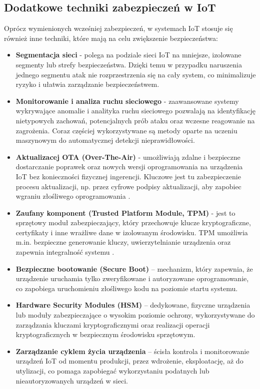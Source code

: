 \subsection{Dodatkowe techniki zabezpieczeń w IoT}
Oprócz wymienionych wcześniej zabezpieczeń, w systemach IoT stosuje się również inne techniki, które mają na celu zwiększenie bezpieczeństwa:
\begin{itemize}
    \item \textbf{Segmentacja sieci} - polega na podziale sieci IoT na mniejsze, izolowane segmenty lub strefy bezpieczeństwa. Dzięki temu w przypadku naruszenia jednego segmentu atak nie rozprzestrzenia się na cały system, co minimalizuje ryzyko i ułatwia zarządzanie bezpieczeństwem.
    
    \item \textbf{Monitorowanie i analiza ruchu sieciowego} - zaawansowane systemy wykrywające anomalie i analityka ruchu sieciowego pozwalają na identyfikację nietypowych zachowań, potencjalnych prób ataku oraz wczesne reagowanie na zagrożenia. Coraz częściej wykorzystywane są metody oparte na uczeniu maszynowym do automatycznej detekcji nieprawidłowości.
    
    \item \textbf{Aktualizacej OTA (Over-The-Air)} - umożliwiają zdalne i bezpieczne dostarczanie poprawek oraz nowych wersji oprogramowania na urządzenia IoT bez konieczności fizycznej ingerencji. Kluczowe jest tu zabezpieczenie procesu aktualizacji, np. przez cyfrowe podpisy aktualizacji, aby zapobiec wgraniu złośliwego oprogramowania \cite{android_ota}.
    
    \item \textbf{Zaufany komponent (Trusted Platform Module, TPM)} - jest to sprzętowy moduł zabezpieczający, który przechowuje klucze kryptograficzne, certyfikaty i inne wrażliwe dane w izolowanym środowisku. TPM umożliwia m.in. bezpieczne generowanie kluczy, uwierzytelnianie urządzenia oraz zapewnia integralność systemu \cite{tpm}.
    
    \item \textbf{Bezpieczne bootowanie (Secure Boot)} – mechanizm, który zapewnia, że urządzenie uruchamia tylko zweryfikowane i autoryzowane oprogramowanie, co zapobiega uruchomieniu złośliwego kodu na poziomie startu systemu.
    
    \item \textbf{Hardware Security Modules (HSM)} – dedykowane, fizyczne urządzenia lub moduły zabezpieczające o wysokim poziomie ochrony, wykorzystywane do zarządzania kluczami kryptograficznymi oraz realizacji operacji kryptograficznych w bezpiecznym środowisku sprzętowym.
    
    \item \textbf{Zarządzanie cyklem życia urządzenia} – ścisła kontrola i monitorowanie urządzeń IoT od momentu produkcji, przez wdrożenie, eksploatację, aż do utylizacji, co pomaga zapobiegać wykorzystaniu podatnych lub nieautoryzowanych urządzeń w sieci.
\end{itemize}

